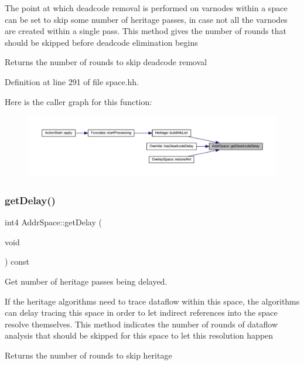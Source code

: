The point at which deadcode removal is performed on varnodes within a space can be set to skip some number of heritage passes, in case not all the varnodes are created within a single pass. This method gives the number of rounds that should be skipped before deadcode elimination begins \begin{DoxyReturn}{Returns}
the number of rounds to skip deadcode removal 
\end{DoxyReturn}


Definition at line 291 of file space.\+hh.

Here is the caller graph for this function\+:
\nopagebreak
\begin{figure}[H]
\begin{center}
\leavevmode
\includegraphics[width=350pt]{class_addr_space_a51295f26c99891cb310af0eb0c20d4db_icgraph}
\end{center}
\end{figure}
\mbox{\label{class_addr_space_a63b510a07fd8450dc432d7e671f79f66}} 
\subsubsection{\texorpdfstring{getDelay()}{getDelay()}}
{\footnotesize\ttfamily int4 Addr\+Space\+::get\+Delay (\begin{DoxyParamCaption}\item[{void}]{ }\end{DoxyParamCaption}) const\hspace{0.3cm}{\ttfamily [inline]}}



Get number of heritage passes being delayed. 

If the heritage algorithms need to trace dataflow within this space, the algorithms can delay tracing this space in order to let indirect references into the space resolve themselves. This method indicates the number of rounds of dataflow analysis that should be skipped for this space to let this resolution happen \begin{DoxyReturn}{Returns}
the number of rounds to skip heritage 
\end{DoxyReturn}


